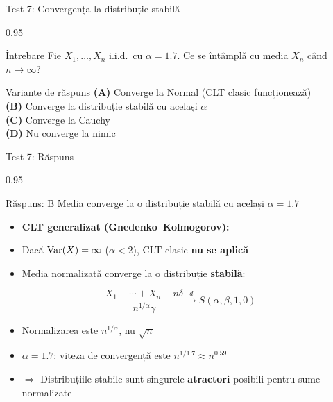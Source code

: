\documentclass[9pt, aspectratio=169, t]{beamer}
\begin{document}
\begin{frame}{Test 7: Convergența la distribuție stabilă}
\begin{cminipage}{0.95\textwidth}
    \begin{alertblock}{Întrebare}
        Fie $X_1, \ldots, X_n$ i.i.d.\ cu $\alpha = 1.7$. Ce se întâmplă cu media $\bar{X}_n$ când $n \to \infty$?
    \end{alertblock}

    \vspace{0.5cm}
    \begin{block}{Variante de răspuns}
    \textcolor{MainBlue}{\textbf{(A)}} Converge la Normal (CLT clasic funcționează)\\[3pt]
    \textcolor{MainBlue}{\textbf{(B)}} Converge la distribuție stabilă cu același $\alpha$\\[3pt]
    \textcolor{MainBlue}{\textbf{(C)}} Converge la Cauchy\\[3pt]
    \textcolor{MainBlue}{\textbf{(D)}} Nu converge la nimic
    \end{block}
\end{cminipage}
\end{frame}

\begin{frame}{Test 7: Răspuns}
\begin{cminipage}{0.95\textwidth}
    \begin{exampleblock}{Răspuns: B}
        Media converge la o distribuție stabilă cu același $\alpha = 1.7$
    \end{exampleblock}

    \vspace{0.2cm}

    \begin{itemize}\setlength{\itemsep}{0pt}
        \item \textbf{CLT generalizat (Gnedenko--Kolmogorov):}
        \item Dacă $\text{Var}(X) = \infty$ ($\alpha < 2$), CLT clasic \textbf{nu se aplică}
        \item Media normalizată converge la o distribuție \textbf{stabilă}:
    \end{itemize}
    $$\frac{X_1 + \cdots + X_n - n\delta}{n^{1/\alpha}\gamma} \xrightarrow{d} S(\alpha, \beta, 1, 0)$$
    \begin{itemize}\setlength{\itemsep}{0pt}
        \item Normalizarea este $n^{1/\alpha}$, nu $\sqrt{n}$
        \item $\alpha = 1.7$: viteza de convergență este $n^{1/1.7} \approx n^{0.59}$
        \item $\Rightarrow$ Distribuțiile stabile sunt singurele \textbf{atractori} posibili pentru sume normalizate
    \end{itemize}
\end{cminipage}
\end{frame}
\end{document}
